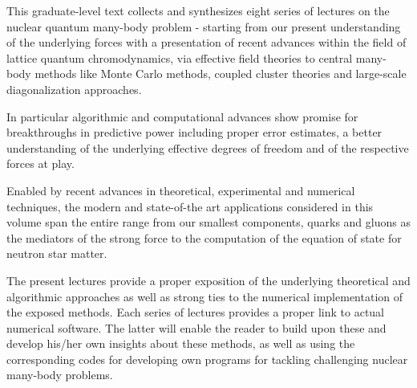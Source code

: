 \preface
This graduate-level text collects and synthesizes eight series of
lectures on the nuclear quantum many-body problem - starting from our
present understanding of the underlying forces with a presentation of
recent advances within the field of lattice quantum chromodynamics,
via effective field theories to central many-body methods like Monte
Carlo methods, coupled cluster theories and large-scale
diagonalization approaches.

In particular algorithmic and computational advances show promise for
breakthroughs in predictive power including proper error estimates, a
better understanding of the underlying effective degrees of freedom
and of the respective forces at play.

Enabled by recent advances in theoretical, experimental and numerical
techniques, the modern and state-of-the art applications considered in
this volume span the entire range from our smallest components, quarks
and gluons as the mediators of the strong force to the computation of
the equation of state for neutron star matter.

 

The present lectures provide a proper exposition of the underlying
theoretical and algorithmic approaches as well as strong ties to the
numerical implementation of the exposed methods. Each series of
lectures provides a proper link to actual numerical software. The
latter will enable the reader to build upon these and develop his/her
own insights about these methods, as well as using the corresponding
codes for developing own programs for tackling challenging nuclear
many-body problems.


